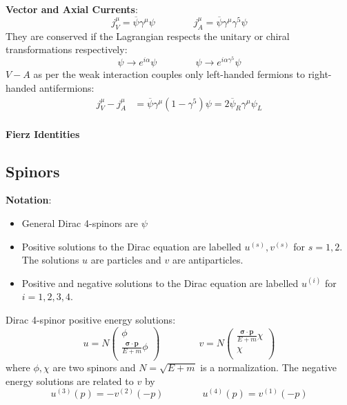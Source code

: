 \documentclass[12pt]{article}
\theoremstyle{definition}
\begin{document}
\textbf{Vector and Axial Currents}:
\begin{equation*}
    j^\mu_V = \overline{\psi} \gamma^\mu \psi \qquad \qquad j^\mu_A = \overline{\psi} \gamma^\mu \gamma^5 \psi
\end{equation*}
They are conserved if the Lagrangian respects the unitary or chiral transformations respectively:
\begin{equation*}
    \psi \to e^{i\alpha} \psi \qquad \qquad \psi \to e^{i\alpha\gamma^5} \psi
\end{equation*}
$V-A$ as per the weak interaction couples only left-handed fermions to right-handed antifermions:
\begin{equation*}
\begin{split}
    j^\mu_V - j^\mu_A
        &= \overline{\psi} \gamma^\mu (1 - \gamma^5) \psi = 2 \overline{\psi}_R \gamma^\mu \psi_L \\
\end{split}
\end{equation*}

\textbf{Fierz Identities}

\subsection{Spinors}

\textbf{Notation}:
\begin{itemize}
    \item General Dirac 4-spinors are $\psi$
    \item Positive solutions to the Dirac equation are labelled $u^{(s)},v^{(s)}$ for $s = 1,2$. The
        solutions $u$ are particles and $v$ are antiparticles.
    \item Positive and negative solutions to the Dirac equation are labelled $u^{(i)}$ for $i=1,2,3,4$.
\end{itemize}

Dirac 4-spinor positive energy solutions:
\begin{equation*}
    u = N
    \begin{pmatrix}
        \phi \\
        \frac{\bm{\sigma} \cdot \bm{p}}{E + m} \phi \\
    \end{pmatrix}
    \qquad \qquad
    v = N
    \begin{pmatrix}
        \frac{\bm{\sigma} \cdot \bm{p}}{E + m} \chi \\
        \chi \\
    \end{pmatrix}
\end{equation*}
where $\phi,\chi$ are two spinors and $N = \sqrt{E + m}$ is a normalization. The negative energy solutions are
related to $v$ by
\begin{equation*}
    u^{(3)}(p) = -v^{(2)}(-p) \qquad \qquad u^{(4)}(p) = v^{(1)}(-p)
\end{equation*}
\end{document}
